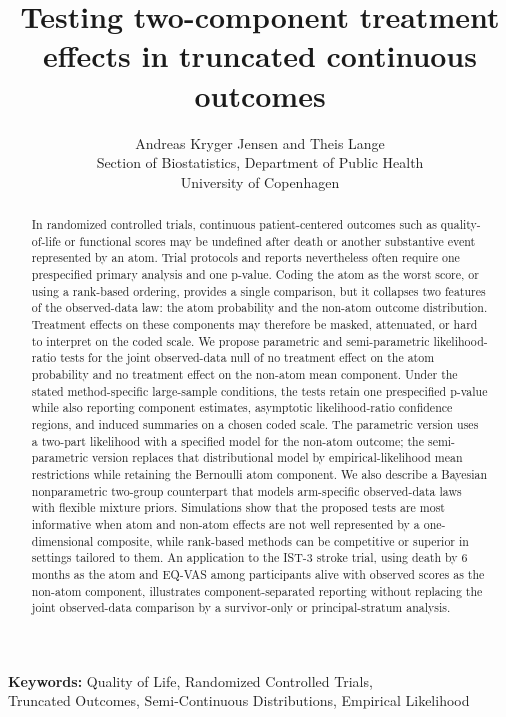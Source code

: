 \documentclass[11pt]{article}
\title{Testing two-component treatment effects in truncated continuous outcomes}
\author{
  Andreas Kryger Jensen and Theis Lange\\
  Section of Biostatistics, Department of Public Health\\
  University of Copenhagen
}
\date{}
\begin{document}
\maketitle

\begin{abstract}
In randomized controlled trials, continuous patient-centered outcomes such as quality-of-life or functional scores may be undefined after death or another substantive event represented by an atom. Trial protocols and reports nevertheless often require one prespecified primary analysis and one p-value. Coding the atom as the worst score, or using a rank-based ordering, provides a single comparison, but it collapses two features of the observed-data law: the atom probability and the non-atom outcome distribution. Treatment effects on these components may therefore be masked, attenuated, or hard to interpret on the coded scale. We propose parametric and semi-parametric likelihood-ratio tests for the joint observed-data null of no treatment effect on the atom probability and no treatment effect on the non-atom mean component. Under the stated method-specific large-sample conditions, the tests retain one prespecified p-value while also reporting component estimates, asymptotic likelihood-ratio confidence regions, and induced summaries on a chosen coded scale. The parametric version uses a two-part likelihood with a specified model for the non-atom outcome; the semi-parametric version replaces that distributional model by empirical-likelihood mean restrictions while retaining the Bernoulli atom component. We also describe a Bayesian nonparametric two-group counterpart that models arm-specific observed-data laws with flexible mixture priors. Simulations show that the proposed tests are most informative when atom and non-atom effects are not well represented by a one-dimensional composite, while rank-based methods can be competitive or superior in settings tailored to them. An application to the IST-3 stroke trial, using death by 6 months as the atom and EQ-VAS among participants alive with observed scores as the non-atom component, illustrates component-separated reporting without replacing the joint observed-data comparison by a survivor-only or principal-stratum analysis.
\end{abstract}

\begin{center}
\textbf{Keywords:} Quality of Life, Randomized Controlled Trials,\\
Truncated Outcomes, Semi-Continuous Distributions, Empirical Likelihood
\end{center}
\end{document}
